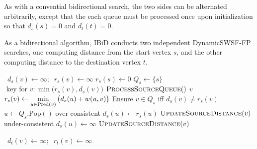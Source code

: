 As with a convential bidirectional search,
the two sides can be alternated arbitrarily,
except that the each queue must be processed once upon initialization
so that $d_s(s) = 0$ and $d_t(t) = 0$.

{
\begin{algorithm}[t]
   \caption{As a bidirectional algorithm,
      IBiD conducts two independent DynamicSWSF-FP searches,
      one computing distance from the start vertex $s$,
      and the other computing distance to the destination vertex $t$.}
   \label{alg:ibid-two-dynamicswsffps}
   \begin{minipage}[t]{8.2cm}
      \begin{algorithmic}[1]
          {\,\!}
               \State $d_s(v) \gets \infty; \;\; r_s(v) \gets \infty$
            \EndFor
            \State $r_s(s) \gets 0$
            \State $Q_s \gets \{ s \}$
               \Comment $\mbox{ key for } v: \min\big(r_s(v),d_s(v)\big)$
            \State $\mbox{\sc ProcessSourceQueue}()$
         \EndProcedure
          {$v$}
               \State $r_s(v) \gets \displaystyle\min_{u \in \mbox{\scriptsize Pred}(v)}
                  \big( d_s(u) + w(u,v) \big)$
            \EndIf
            \State Ensure $v \in Q_s$ iff $d_s(v) \neq r_s(v)$
         \EndProcedure
          {\,\!}
            \State $u \gets Q_s.\mbox{Pop}()$
                  \Comment over-consistent
               \State $d_s(u) \gets r_s(u)$
                  \State $\mbox{\sc UpdateSourceDistance}(v)$
               \EndFor
            \Else
                  \Comment under-consistent
               \State $d_s(u) \gets \infty$
                  \State $\mbox{\sc UpdateSourceDistance}(v)$
               \EndFor
            \EndIf
         \EndProcedure
      \end{algorithmic}
   \end{minipage}
   \quad
   \begin{minipage}[t]{8.2cm}
      \begin{algorithmic}[1]
          {\,\!}
               \State $d_t(v) \gets \infty; \;\; r_t(v) \gets \infty$

\end{algorithmic}
\end{minipage}
\end{algorithm}}
